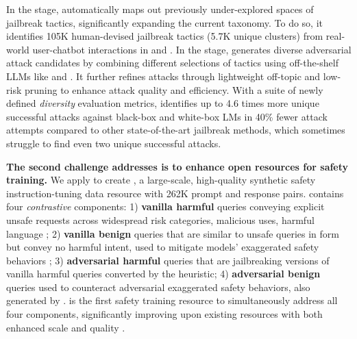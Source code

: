 In the \mine stage, \method automatically maps out previously under-explored spaces of jailbreak tactics, significantly expanding the current taxonomy. To do so, it identifies 105K human-devised jailbreak tactics (5.7K unique clusters) from real-world user-chatbot interactions in \lmsys \citep{zheng2023lmsyschat1m} and \wildchat \citep{zhao2024inthewildchat}. In the \compose stage, \method generates diverse adversarial attack candidates by combining different selections of tactics using off-the-shelf LLMs like \mixtral \citep{jiang2024mixtral} and \gptfour \citep{openai2024gpt4}. It further refines attacks through lightweight off-topic and low-risk pruning to enhance attack quality and efficiency. With a suite of newly defined \textit{diversity} evaluation metrics, \method identifies up to 4.6 times more unique successful attacks against black-box and white-box LMs in 40\% fewer attack attempts compared to other state-of-the-art jailbreak methods, which sometimes struggle to find even two unique successful attacks.

\textbf{The second challenge \method addresses is to enhance open resources for safety training.} We apply \method to create \dataset, a large-scale, high-quality synthetic safety instruction-tuning data resource with 262K prompt and response pairs. \dataset contains four \textit{contrastive} components: 1) \textbf{vanilla harmful} queries conveying explicit unsafe requests across widespread risk categories, \eg malicious uses, harmful language \citep{weidinger2022taxonomy}; 2) \textbf{vanilla benign} queries that are similar to unsafe queries in form but convey no harmful intent, used to mitigate models' exaggerated safety behaviors \citep{safetytuned_llama}; 3) \textbf{adversarial harmful} queries that are jailbreaking versions of vanilla harmful queries converted by the \method heuristic; 4) \textbf{adversarial benign} queries used to counteract adversarial exaggerated safety behaviors, also generated by \method. \dataset is the first safety training resource to simultaneously address all four components, significantly improving upon existing resources with both enhanced scale and quality \citep{hh-rlhf,hh-rlhf-preference,safetytuned_llama,safe-rlhf}.


